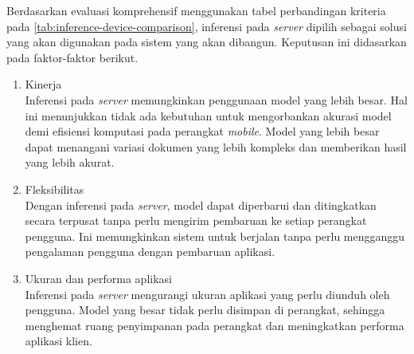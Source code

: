 Berdasarkan evaluasi komprehensif menggunakan tabel perbandingan kriteria pada \autoref{tab:inference-device-comparison}, inferensi pada \emph{server} dipilih sebagai solusi yang akan digunakan pada sistem yang akan dibangun. Keputusan ini didasarkan pada faktor-faktor berikut.
\begin{enumerate}
    \item Kinerja ~\\
    Inferensi pada \emph{server} memungkinkan penggunaan model yang lebih besar. Hal ini menunjukkan tidak ada kebutuhan untuk mengorbankan akurasi model demi efisiensi komputasi pada perangkat \emph{mobile}. Model yang lebih besar dapat menangani variasi dokumen yang lebih kompleks dan memberikan hasil yang lebih akurat.
    \item Fleksibilitas ~\\
    Dengan inferensi pada \emph{server}, model dapat diperbarui dan ditingkatkan secara terpusat tanpa perlu mengirim pembaruan ke setiap perangkat pengguna. Ini memungkinkan sistem untuk berjalan tanpa perlu mengganggu pengalaman pengguna dengan pembaruan aplikasi.
    \item Ukuran dan performa aplikasi ~\\
    Inferensi pada \emph{server} mengurangi ukuran aplikasi yang perlu diunduh oleh pengguna. Model yang besar tidak perlu disimpan di perangkat, sehingga menghemat ruang penyimpanan pada perangkat dan meningkatkan performa aplikasi klien.
\end{enumerate}


